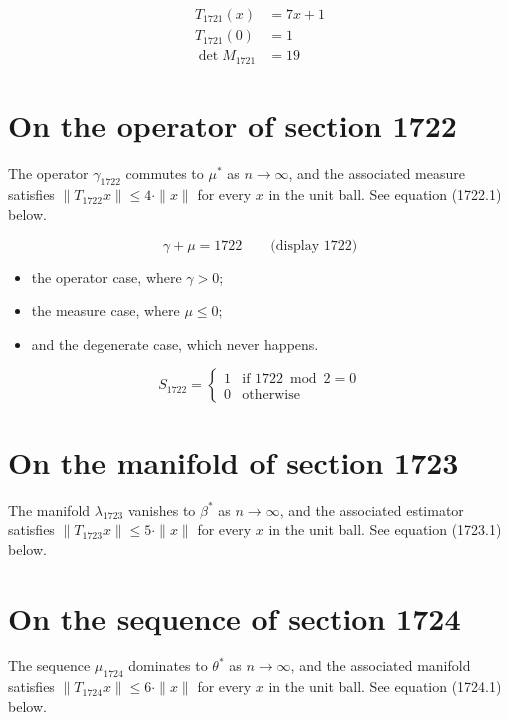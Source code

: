 \documentclass{article}
\begin{document}
\begin{align}
T_{1721}(x) &= 7 x + 1 \\
T_{1721}(0) &= 1 \\
\det M_{1721} &= 19
\end{align}

\section{On the operator of section 1722}
The operator $\gamma_{1722}$ commutes to $\mu^{*}$ as $n \to \infty$,
and the associated measure satisfies $\|T_{1722} x\| \leq 4 \cdot \|x\|$
for every $x$ in the unit ball. See equation (1722.1) below.

$$
\gamma + \mu = 1722 \qquad \text{(display 1722)}
$$

\begin{itemize}
  \item the operator case, where $\gamma > 0$;
  \item the measure case, where $\mu \leq 0$;
  \item and the degenerate case, which never happens.
\end{itemize}

\begin{equation}
S_{1722} = \begin{cases} 1 & \text{if } 1722 \bmod 2 = 0 \\ 0 & \text{otherwise} \end{cases}
\end{equation}

\section{On the manifold of section 1723}
The manifold $\lambda_{1723}$ vanishes to $\beta^{*}$ as $n \to \infty$,
and the associated estimator satisfies $\|T_{1723} x\| \leq 5 \cdot \|x\|$
for every $x$ in the unit ball. See equation (1723.1) below.

\section{On the sequence of section 1724}
The sequence $\mu_{1724}$ dominates to $\theta^{*}$ as $n \to \infty$,
and the associated manifold satisfies $\|T_{1724} x\| \leq 6 \cdot \|x\|$
for every $x$ in the unit ball. See equation (1724.1) below.
\end{document}
